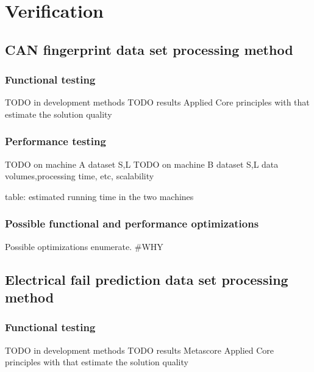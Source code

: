 \chapter{Verification}
\section{CAN fingerprint data set processing method}
\subsection{Functional testing}
TODO in development methods
TODO results
Applied Core principles with that estimate the solution quality
\subsection{Performance testing}
TODO on machine A dataset S,L
TODO on machine B dataset S,L
	data volumes,processing time, etc, scalability

table: estimated running time in the two machines
\subsection{Possible functional and performance optimizations}
Possible optimizations enumerate.
\#WHY
\section{Electrical fail prediction data set processing method}
\subsection{Functional testing}
TODO in development methods
TODO results
Metascore
Applied Core principles with that estimate the solution quality
